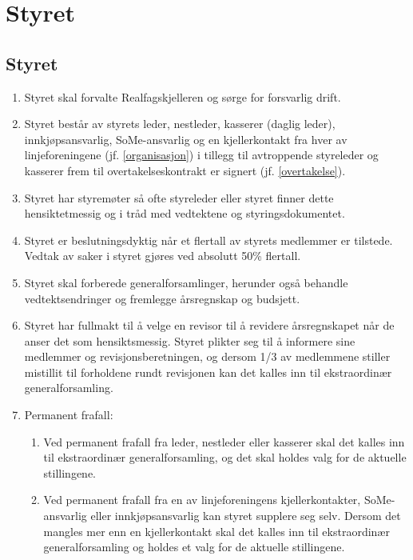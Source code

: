 \section{Styret} \label{styret}

\subsection{Styret} \label{subsec:styret}
\begin{enumerate}
    \item Styret skal forvalte Realfagskjelleren og sørge for forsvarlig drift. 
    \item Styret består av styrets leder, nestleder, kasserer (daglig leder), innkjøpsansvarlig,  SoMe-ansvarlig og en kjellerkontakt fra hver av linjeforeningene (jf. \ref{organisasjon}) i tillegg til avtroppende styreleder og kasserer frem til overtakelseskontrakt er signert (jf. \ref{overtakelse}). 
    \item Styret har styremøter så ofte styreleder eller styret finner dette hensiktetmessig og i tråd med vedtektene og styringsdokumentet.
    \item Styret er beslutningsdyktig når et flertall av styrets medlemmer er tilstede. Vedtak av saker i styret gjøres ved absolutt 50\% flertall.
    \item Styret skal forberede generalforsamlinger, herunder også behandle vedtektsendringer og fremlegge årsregnskap og budsjett.
    \item Styret har fullmakt til å velge en revisor til å revidere årsregnskapet når de anser det som hensiktsmessig. Styret plikter seg til å informere sine medlemmer og revisjonsberetningen, og dersom 1/3 av medlemmene stiller mistillit til forholdene rundt revisjonen kan det kalles inn til ekstraordinær generalforsamling.
    \item Permanent frafall:
    \begin{enumerate}
        \item Ved permanent frafall fra leder, nestleder eller kasserer skal det kalles inn til ekstraordinær generalforsamling, og det skal holdes valg for de aktuelle stillingene.
        \item Ved permanent frafall fra en av linjeforeningens kjellerkontakter, SoMe-ansvarlig eller innkjøpsansvarlig kan styret supplere seg selv. Dersom det mangles mer enn en kjellerkontakt skal det kalles inn til ekstraordinær generalforsamling og holdes et valg for de aktuelle stillingene.
    \end{enumerate}
\end{enumerate}

